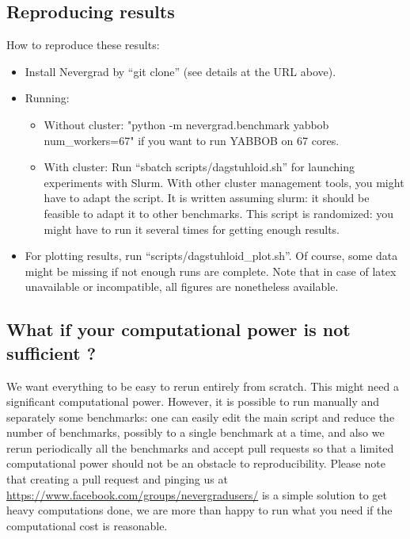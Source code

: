 \documentclass{article}
\begin{document}
\subsection{Reproducing results}
How to reproduce these results:
\begin{itemize}
\item Install Nevergrad by “git clone” (see details at the URL above).
\item  Running:
\begin{itemize}
\item Without cluster: "python -m nevergrad.benchmark yabbob \-\-num\_workers=67" if you want to run YABBOB on 67 cores. 
\item With cluster: Run “sbatch scripts/dagstuhloid.sh” for launching experiments with Slurm. With other cluster management tools, you might have to adapt the script. It is written assuming slurm: it should be feasible to adapt it to other benchmarks. This script is randomized: you might have to run it several times for getting enough results.
\end{itemize}
\item For plotting results, run “scripts/dagstuhloid\_plot.sh”. Of course, some data might be missing if not enough runs are complete. Note that in case of latex unavailable or incompatible, all figures are nonetheless available.
\end{itemize}

\subsection{What if your computational power is not sufficient ?}
We want everything to be easy to rerun entirely from scratch. This might need a significant computational power.  However, it is possible to run manually and separately some benchmarks: one can easily edit the main script and reduce the number of benchmarks, possibly to a single benchmark at a time, and also we rerun periodically all the benchmarks and accept pull requests so that a limited computational power should not be an obstacle to reproducibility.
Please note that creating a pull request and pinging us at \url{https://www.facebook.com/groups/nevergradusers/} is a simple solution to get heavy computations done, we are more than happy to run what you need if the computational cost is reasonable. 
\end{document}
